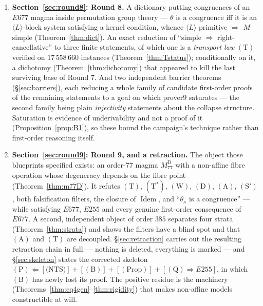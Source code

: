 \documentclass[11pt]{article}
\theoremstyle{plain}
\theoremstyle{definition}
\theoremstyle{remark}
\numberwithin{equation}{section}
\newcommand{\Idem}{\operatorname{Idem}}
\begin{document}
\begin{enumerate}
\item \textbf{Section~\ref{sec:round8}: Round 8.} A dictionary putting congruences of an
$E677$ magma inside permutation group theory --- $\theta$ is a congruence iff it is an
$\langle L\rangle$-block system satisfying a kernel condition, whence
$\langle L\rangle$ primitive $\Rightarrow$ $M$ simple
(Theorem~\ref{thm:dict}). An exact reduction of ``simple $\Rightarrow$ right-cancellative''
to three finite statements, of which one is a \emph{transport law} $(\mathrm{T})$ verified on
$17\,558\,660$ instances (Theorem~\ref{thm:Tstatus}); conditionally on it, a dichotomy
(Theorem~\ref{thm:dichotomy}) that appeared to kill the last surviving base of Round 7.
And two
independent barrier theorems (\S\ref{sec:barriers}), each reducing a whole family of
candidate first-order proofs of the remaining statements to a goal on which prover9
saturates --- the second family being plain \emph{injectivity} statements about the
collapse structure. Saturation is evidence of underivability and not a proof of it
(Proposition~\ref{prop:B1}), so these bound the campaign's technique rather than
first-order reasoning itself.

\item \textbf{Section~\ref{sec:round9}: Round 9, and a retraction.} The object those
blueprints specified exists: an order-$77$ magma $M_{77}^{\mathrm{D}}$ with a non-affine
fibre operation whose degeneracy depends on the fibre point (Theorem~\ref{thm:m77D}). It
refutes $(\mathrm{T})$, $(\mathrm{T}^{*})$, $(\mathrm{W})$, $(\mathrm{D})$,
$(\mathrm{A})$, $(\mathrm{S}')$, both falsification filters, the closure of $\Idem$, and
``$\theta_\kappa$ is a congruence'' --- while satisfying $E677$, $E255$ and every genuine
first-order consequence of $E677$. A second, independent object of order $385$ separates
four strata (Theorem~\ref{thm:strata}) and shows the filters have a blind spot and that
$(\mathrm{A})$ and $(\mathrm{T})$ are decoupled. \S\ref{sec:retraction} carries out the
resulting retraction chain in full --- nothing is deleted, everything is marked --- and
\S\ref{sec:skeleton} states the corrected skeleton
$(\mathrm{P})\Leftarrow[\text{(NTS)}]+[(\mathrm{B})]+[(\mathrm{Prop})]+[(\mathrm{Q})\Rightarrow E255]$,
in which $(\mathrm{B})$ has newly lost its proof. The positive residue is the machinery
(Theorems~\ref{thm:eq4gen}--\ref{thm:rigidity}) that makes non-affine models constructible
at will.


\end{enumerate}
\end{document}
